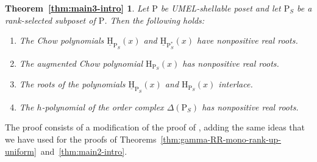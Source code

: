\documentclass[11pt,a4paper]{amsart}
\theoremstyle{results}
\theoremstyle{definitions}
\def\P{\mathbb{P}}
\newcommand{\uH}{\underline{\mathrm{H}}}
\renewcommand{\P}{\mathrm{P}}
\renewcommand{\H}{\mathrm{H}}
\begin{document}
\newtheorem*{thm:intro3}{Theorem~\ref{thm:main3-intro}}
\begin{thm:intro3}
    {\itshape 
    Let $\P$ be UMEL-shellable poset and let $\P_S$ be a rank-selected subposet of $\P$. Then the following holds:
    \begin{enumerate}[\normalfont (i)]
        \item The Chow polynomials $\uH_{\P_S}(x)$ and $\uH_{\P_S^*}(x)$ have nonpositive real roots.
        \item The augmented Chow polynomial $\H_{\P_S}(x)$ has nonpositive real roots.
        \item The roots of the polynomials $\uH_{\P_S}(x)$ and $\H_{\P_S}(x)$ interlace.
        \item The $h$-polynomial of the order complex $\Delta(\P_S)$ has nonpositive real roots.
    \end{enumerate}
    }
\end{thm:intro3}
The proof consists of a modification of the proof of \cite[Theorem 3.1]{athanasiadis-douvropoulos-kalampogia}, adding the same ideas that we have used for the proofs of Theorems~\ref{thm:gamma-RR-mono-rank-up-uniform}~and~\ref{thm:main2-intro}. 
\end{document}
